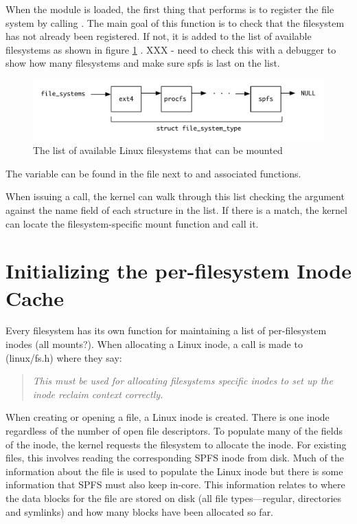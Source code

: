 \noindent
When the module is loaded, the first thing that  performs is to register the file system by calling . The main goal of this function is to check that the filesystem has not already been registered. If not, it is added to the list of available filesystems as shown in figure \ref{fig:filesystems-available} . XXX - need to check this with a debugger to show how many filesystems and make sure spfs is last on the list.

\begin{figure}[h]
	\includegraphics[scale=0.6]{figures/filesystems-available.pdf}
	\centering
	\caption{The list of available Linux filesystems that can be mounted}
	\label{fig:filesystems-available}
\end{figure}

The  variable can be found in the file  next to  and associated functions.

When issuing a  call, the kernel can walk through this list checking the  argument against the name field of each  structure in the list. If there is a match, the kernel can locate the filesystem-specific mount function and call it.


\section{Initializing the per-filesystem Inode Cache}

Every filesystem has its own  function for maintaining a list of per-filesystem inodes (all mounts?). When allocating a Linux inode, a call is made to  (linux/fs.h) where they say:

\begin{quote}
\it This must be used for allocating filesystems specific inodes to set up the inode reclaim context correctly.
\end{quote}

\noindent
When creating or opening a file, a Linux inode is created. There is one inode regardless of the number of open file descriptors. To populate many of the fields of the inode, the kernel requests the filesystem to allocate the inode. For existing files, this involves reading the corresponding SPFS inode from disk. Much of the information about the file is used to populate the Linux inode but there is some information that SPFS must also keep in-core. This information relates to where the data blocks for the file are stored on disk (all file types---regular, directories and symlinks) and how many blocks have been allocated so far.

